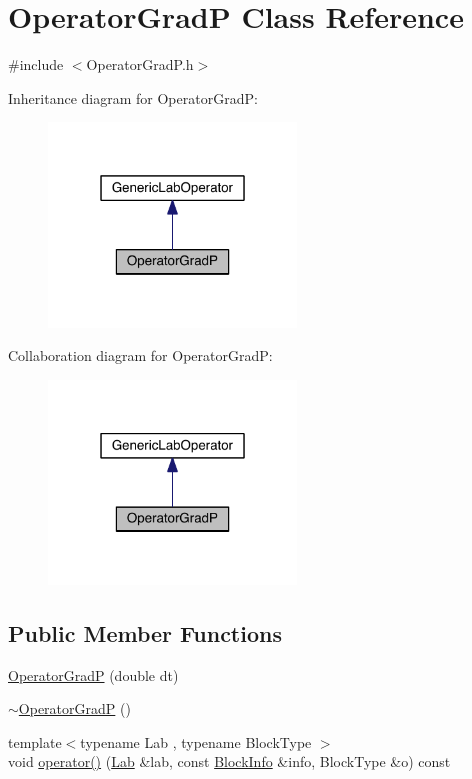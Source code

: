 \hypertarget{class_operator_grad_p}{}\section{Operator\+Grad\+P Class Reference}
\label{class_operator_grad_p}


{\ttfamily \#include $<$Operator\+Grad\+P.\+h$>$}



Inheritance diagram for Operator\+Grad\+P\+:\nopagebreak
\begin{figure}[H]
\begin{center}
\leavevmode
\includegraphics[width=187pt]{da/d8c/class_operator_grad_p__inherit__graph}
\end{center}
\end{figure}


Collaboration diagram for Operator\+Grad\+P\+:\nopagebreak
\begin{figure}[H]
\begin{center}
\leavevmode
\includegraphics[width=187pt]{d5/da5/class_operator_grad_p__coll__graph}
\end{center}
\end{figure}
\subsection*{Public Member Functions}
\begin{DoxyCompactItemize}
\item 
\hyperlink{class_operator_grad_p_a90f6bdde5a07401f14be380ef6cf13e0}{Operator\+Grad\+P} (double dt)
\item 
\hyperlink{class_operator_grad_p_a1e88f7317d635f1f842158663b197911}{$\sim$\+Operator\+Grad\+P} ()
\item 
{\footnotesize template$<$typename Lab , typename Block\+Type $>$ }\\void \hyperlink{class_operator_grad_p_a0783ffd9da959ff251913634ebd16487}{operator()} (\hyperlink{_definitions_8h_ae720d9054713370bbf4c86860e4dde70}{Lab} \&lab, const \hyperlink{struct_block_info}{Block\+Info} \&info, Block\+Type \&o) const 
\end{DoxyCompactItemize}
